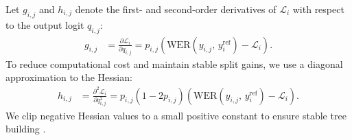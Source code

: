 \documentclass[journal]{IEEEtran}
\begin{document}
    Let $g_{i,j}$ and $h_{i,j}$ denote the first- and second-order derivatives of $\mathcal{L}_{i}$ with respect to the output logit $q_{i,j}$:
    \begin{align}
        g_{i,j} & = \frac{\partial \mathcal{L}_{i}}{\partial q_{i,j}} = p_{i,j}\left(\mathrm{WER}(y_{i,j}, \,y_i^{\mathrm{ref}})-\mathcal{L}_{i}\right). \label{eq:gradient}
    \end{align}
    To reduce computational cost and maintain stable split gains, we use a diagonal approximation to the Hessian:
    \begin{align}
        h_{i,j} & = \frac{\partial^{2}\mathcal{L}_{i}}{\partial q_{i,j}^{2}} = p_{i,j}(1-2p_{i,j}) \left(\mathrm{WER}(y_{i,j},\,y_i^{\mathrm{ref}})-\mathcal{L}_{i}\right). \label{eq:hessian}
    \end{align}
    We clip negative Hessian values to a small positive constant to ensure stable tree building \cite{chen2016xgboost}. 
\end{document}
